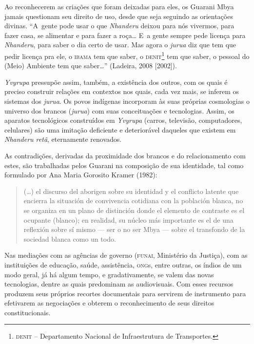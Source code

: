 Ao reconhecerem as criações que foram deixadas para eles, os Guarani
Mbya jamais questionam seu direito de uso, desde que seja seguindo as
orientações divinas. ``A~gente pode usar o que \emph{Nhanderu} deixou para nós
vivermos, para fazer casa, se alimentar e para fazer a roça\ldots{} E~a
gente sempre pede licença para \emph{Nhanderu}, para saber o dia certo de
usar. Mas agora o \emph{jurua} diz que tem que pedir licença pra ele, o \textsc{ibama}
tem que saber, o \textsc{denit}\footnote{\textsc{denit} -- Departamento Nacional de
Infraestrutura de Transportes.} tem que saber, o pessoal do (Meio)
Ambiente tem que saber\ldots{}'' (Ladeira, 2008 [2002]).

\emph{Yvyrupa} pressupõe assim, também, a existência dos outros, com os quais é
preciso construir relações em contextos nos quais, cada vez mais, se
inferem os sistemas dos \emph{jurua}. Os povos indígenas incorporam às suas
próprias cosmologias o universo dos brancos (\emph{jurua}) com suas
conceituações e tecnologias. Assim, os aparatos tecnológicos
construídos em \emph{Yvyrupa} (carros, televisão, computadores, celulares) são
uma imitação deficiente e deteriorável daqueles que existem em \emph{Nhanderu
retã}, eternamente renovados.

As contradições, derivadas da proximidade dos brancos e do
relacionamento com estes, são trabalhadas pelos Guarani na composição
de sua identidade, tal como formulado por Ana Maria Gorosito Kramer
(1982): 

\begin{quote}
(\ldots{}) el discurso del aborigen sobre su identidad y el conflicto latente
que encierra la situación de convivencia cotidiana con la población
blanca, no se organiza en un plano de distinción donde el elemento de
contraste es el ocupante (blanco); en realidad, su núcleo más
importante es el de una reflexión sobre sí mismo --- ser o no ser Mbya ---
sobre el transfondo de la sociedad blanca como un todo.
\end{quote}

Nas mediações com as agências de governo (\textsc{funai}, Ministério da Justiça),
com as instituições de educação, saúde, assistência, \textsc{ong}s, entre
outras, os índios de um modo geral, já há algum tempo, e
gradativamente, se valem das novas tecnologias, dentre as quais
predominam as audiovisuais. Com esses recursos produzem seus próprios
recortes documentais para servirem de instrumento para efetivarem as
negociações e obterem o reconhecimento de seus direitos
constitucionais.

